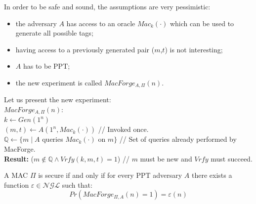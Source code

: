 \documentclass[../main]{subfiles}
\begin{document}
\noindent
In order to be safe and sound, the assumptions are very pessimistic:
\begin{itemize}
    \item the adversary $A$ has access to an oracle $Mac_k(\cdot)$ which can be used to generate all possible tags;
    \item having access to a previously generated pair ($m$,$t$) is not interesting;
    \item $A$ has to be PPT;
    \item the new experiment is called $MacForge_{A,\Pi}(n)$.
\end{itemize}

\noindent
Let us present the new experiment:\\
$MacForge_{A,\Pi}(n):$\\
$k \leftarrow{} Gen(1^n)$\\
$(m,t) \leftarrow{} A(1^n,Mac_k(\cdot))$ // Invoked once.\\
$\mathbb{Q} \leftarrow{} \{m \; | \; A$ queries $Mac_k(\cdot)$ on $m\}$ // Set of queries already performed by MacForge.\\
\textbf{Result:} ($m \notin{\mathbb{Q}} \wedge{} Vrfy(k,m,t) = 1$) // $m$ must be new and $Vrfy$ must succeed.

\begin{definition}
    A MAC $\Pi$ is secure if and only if for every PPT adversary $A$ there exists a function $\varepsilon{} \in{} \mathcal{NGL}$ such that:
    $$Pr(MacForge_{\Pi,A}(n) = 1) = \varepsilon(n)$$
\end{definition}
\end{document}
